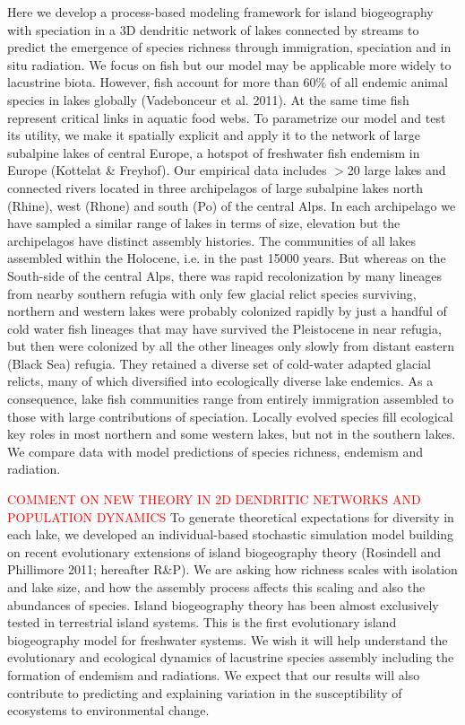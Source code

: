 \documentclass[11pt]{article}
\newcommand{\carlos}[1]{\textcolor{Red}{#1}}
\begin{document}
{Here we develop a process-based modeling framework for island
biogeography with speciation in a 3D dendritic network of lakes
connected by streams to predict the emergence of species richness
through immigration, speciation and in situ radiation. We focus on
fish but our model may be applicable more widely to lacustrine
biota. However, fish account for more than 60$\%$ of all endemic
animal species in lakes globally (Vadebonceur et al. 2011). At the
same time fish represent critical links in aquatic food webs. To
parametrize our model and test its utility, we make it spatially
explicit and apply it to the network of large subalpine lakes of
central Europe, a hotspot of freshwater fish endemism in Europe
(Kottelat & Freyhof). Our
empirical data includes $>$20 large lakes and connected rivers located
in three archipelagos of large subalpine lakes north (Rhine), west
(Rhone) and south (Po) of the central Alps. In each archipelago we
have sampled a similar range of lakes in terms of size, elevation but
the archipelagos have distinct assembly histories. The communities of
all lakes assembled within the Holocene, i.e. in the past 15000
years. But whereas on the South-side of the central Alps, there was
rapid recolonization by many lineages from nearby southern refugia
with only few glacial relict species surviving, northern and western
lakes were probably colonized rapidly by just a handful of cold water
fish lineages that may have survived the Pleistocene in near refugia,
but then were colonized by all the other lineages only slowly from
distant eastern (Black Sea) refugia. They retained a diverse set of
cold-water adapted glacial relicts, many of which diversified into
ecologically diverse lake endemics. As a consequence, lake fish
communities range from entirely immigration assembled to those with
large contributions of speciation. Locally evolved species fill
ecological key roles in most northern and some western lakes, but not
in the southern lakes. We compare data with model predictions of
species richness, endemism and radiation.

\carlos{COMMENT ON NEW THEORY IN 2D DENDRITIC NETWORKS AND POPULATION
  DYNAMICS} To generate theoretical expectations for diversity in each
lake, we developed an individual-based stochastic simulation model
building on recent evolutionary extensions of island biogeography
theory (Rosindell and Phillimore 2011; hereafter R&P). We are asking
how richness scales with isolation and lake size, and how the assembly
process affects this scaling and also the abundances of species. Island biogeography theory has
been almost exclusively tested in terrestrial island systems. This is
the first evolutionary island biogeography model for freshwater
systems. We wish it will help understand the evolutionary and
ecological dynamics of lacustrine species assembly including the
formation of endemism and radiations. We expect that our results will
also contribute to predicting and explaining variation in the
susceptibility of ecosystems to environmental change.

}
\end{document}
